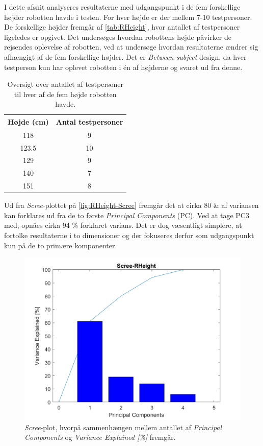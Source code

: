 I dette afsnit analyseres resultaterne med udgangspunkt i de fem forskellige højder robotten havde i testen. For hver højde er der mellem 7-10 testpersoner. De forskellige højder fremgår af \autoref{tab:RHeight}, hvor antallet af testpersoner ligeledes er opgivet. Det undersøges hvordan robottens højde påvirker de rejsendes oplevelse af robotten, ved at undersøge hvordan resultaterne ændrer sig afhængigt af de fem forskellige højder. Det er \textit{Between-subject} design, da hver testperson kun har oplevet robotten i én af højderne og svaret ud fra denne.
%
\begin{table}[H]
\centering
\begin{tabular}{c|c}
Højde (cm) & Antal testpersoner \\ \hline
118   & 9     \\ \hline
123.5 & 10    \\ \hline
129   & 9     \\ \hline
140   & 7     \\ \hline
151   & 8    \\
\end{tabular}
\caption{Oversigt over antallet af testpersoner til hver af de fem højde robotten havde.}
\label{tab:RHeight}
\end{table}
\noindent
%
Ud fra \textit{Scree}-plottet på \autoref{fig:RHeight-Scree} fremgår det at cirka 80 \& af variansen kan forklares ud fra de to første \textit{Principal Components} (PC). Ved at tage PC3 med, opnåes cirka 94 \% forklaret varians. Det er dog væsentligt simplere, at fortolke resultaterne i to dimensioner og der fokuseres derfor som udgangspunkt kun på de to primære komponenter.
%
\begin{figure}[H]
\centering
\includegraphics[width=\textwidth]{Figure/DatabehandlingSkalaer/PCAfigures/RHeight-Scree.png}
\caption{\textit{Scree}-plot, hvorpå sammenhængen mellem antallet af \textit{Principal Components} og \textit{Variance Explained [\%]} fremgår.}
\label{fig:RHeight-Scree}
\end{figure}
